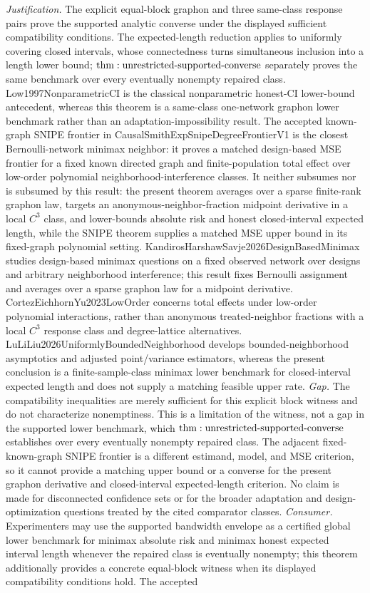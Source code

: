 \documentclass{article}
\begin{document}
\par\smallskip\noindent \textit{Justification.} The explicit equal-block graphon and three same-class response pairs prove the supported analytic converse under the displayed sufficient compatibility conditions. The expected-length reduction applies to uniformly covering closed intervals, whose connectedness turns simultaneous inclusion into a length lower bound; \({\rm thm:unrestricted\text{-}supported\text{-}converse}\) separately proves the same benchmark over every eventually nonempty repaired class. Low1997NonparametricCI is the classical nonparametric honest-CI lower-bound antecedent, whereas this theorem is a same-class one-network graphon lower benchmark rather than an adaptation-impossibility result. The accepted known-graph SNIPE frontier in CausalSmithExpSnipeDegreeFrontierV1 is the closest Bernoulli-network minimax neighbor: it proves a matched design-based MSE frontier for a fixed known directed graph and finite-population total effect over low-order polynomial neighborhood-interference classes. It neither subsumes nor is subsumed by this result: the present theorem averages over a sparse finite-rank graphon law, targets an anonymous-neighbor-fraction midpoint derivative in a local \(C^3\) class, and lower-bounds absolute risk and honest closed-interval expected length, while the SNIPE theorem supplies a matched MSE upper bound in its fixed-graph polynomial setting. KandirosHarshawSavje2026DesignBasedMinimax studies design-based minimax questions on a fixed observed network over designs and arbitrary neighborhood interference; this result fixes Bernoulli assignment and averages over a sparse graphon law for a midpoint derivative. CortezEichhornYu2023LowOrder concerns total effects under low-order polynomial interactions, rather than anonymous treated-neighbor fractions with a local \(C^3\) response class and degree-lattice alternatives. LuLiLiu2026UniformlyBoundedNeighborhood develops bounded-neighborhood asymptotics and adjusted point/variance estimators, whereas the present conclusion is a finite-sample-class minimax lower benchmark for closed-interval expected length and does not supply a matching feasible upper rate. \textit{Gap.} The compatibility inequalities are merely sufficient for this explicit block witness and do not characterize nonemptiness. This is a limitation of the witness, not a gap in the supported lower benchmark, which \({\rm thm:unrestricted\text{-}supported\text{-}converse}\) establishes over every eventually nonempty repaired class. The adjacent fixed-known-graph SNIPE frontier is a different estimand, model, and MSE criterion, so it cannot provide a matching upper bound or a converse for the present graphon derivative and closed-interval expected-length criterion. No claim is made for disconnected confidence sets or for the broader adaptation and design-optimization questions treated by the cited comparator classes. \textit{Consumer.} Experimenters may use the supported bandwidth envelope as a certified global lower benchmark for minimax absolute risk and minimax honest expected interval length whenever the repaired class is eventually nonempty; this theorem additionally provides a concrete equal-block witness when its displayed compatibility conditions hold. The accepted 
\end{document}
